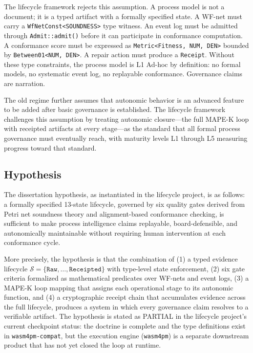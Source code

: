 The lifecycle framework rejects this assumption. A process model is not a document; it is
a typed artifact with a formally specified state. A WF-net must carry a
\texttt{WfNetConst<SOUNDNESS>} type witness. An event log must be admitted through
\texttt{Admit::admit()} before it can participate in conformance computation. A
conformance score must be expressed as \texttt{Metric<Fitness, NUM, DEN>} bounded by
\texttt{Between01<NUM, DEN>}. A repair action must produce a \texttt{Receipt}. Without
these type constraints, the process model is L1 Ad-hoc by definition: no formal models,
no systematic event log, no replayable conformance. Governance claims are narration.

The old regime further assumes that autonomic behavior is an advanced feature to be added
after basic governance is established. The lifecycle framework challenges this assumption
by treating autonomic closure---the full MAPE-K loop with receipted artifacts at every
stage---as the standard that all formal process governance must eventually reach, with
maturity levels L1 through L5 measuring progress toward that standard.

\subsection{Hypothesis}
\label{sec:lifecycle-question-hypothesis}

The dissertation hypothesis, as instantiated in the lifecycle project, is as follows:
a formally specified 13-state lifecycle, governed by six quality gates derived from
Petri net soundness theory and alignment-based conformance checking, is sufficient to
make process intelligence claims replayable, board-defensible, and autonomically
maintainable without requiring human intervention at each conformance cycle.

More precisely, the hypothesis is that the combination of (1) a typed evidence lifecycle
$\mathcal{S} = \{\texttt{Raw}, \ldots, \texttt{Receipted}\}$ with type-level state
enforcement, (2) six gate criteria formalized as mathematical predicates over WF-nets and
event logs, (3) a MAPE-K loop mapping that assigns each operational stage to its autonomic
function, and (4) a cryptographic receipt chain that accumulates evidence across the full
lifecycle, produces a system in which every governance claim resolves to a verifiable
artifact. The hypothesis is stated as PARTIAL in the lifecycle project's current
checkpoint status: the doctrine is complete and the type definitions exist in
\texttt{wasm4pm-compat}, but the execution engine (\texttt{wasm4pm}) is a separate
downstream product that has not yet closed the loop at runtime.

